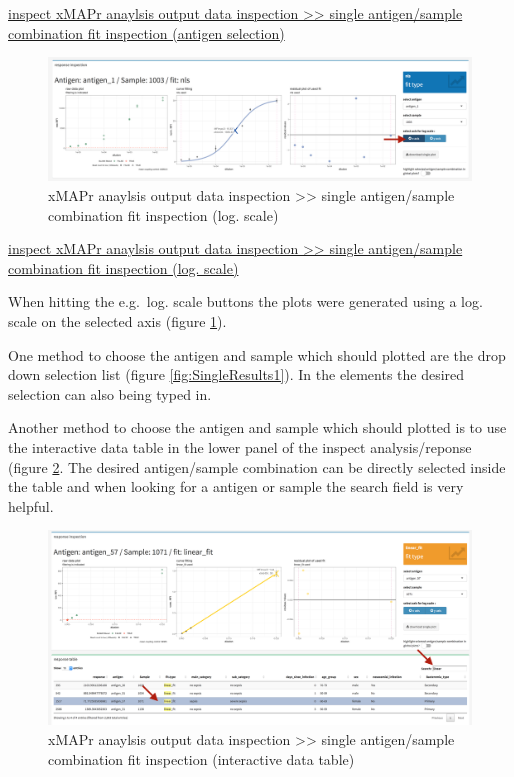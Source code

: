 \documentclass[
]{book}
\begin{document}
\href{figures/inspect_single_results1.png}{inspect xMAPr anaylsis output data inspection \textgreater\textgreater{} single antigen/sample combination fit inspection (antigen selection)}

\begin{figure}
\includegraphics[width=54.97in]{figures/inspect_single_results2} \caption{xMAPr anaylsis output data inspection >> single antigen/sample combination fit inspection (log. scale)}\label{fig:SingleResults2}
\end{figure}

\href{figures/inspect_single_results2.png}{inspect xMAPr anaylsis output data inspection \textgreater\textgreater{} single antigen/sample combination fit inspection (log. scale)}

When hitting the e.g.~log. scale buttons the plots were generated using a log. scale on the selected axis (figure \ref{fig:SingleResults2}).

One method to choose the antigen and sample which should plotted are the drop down selection list (figure \ref{fig:SingleResults1}). In the elements the desired selection can also being typed in.

Another method to choose the antigen and sample which should plotted is to use the interactive data table in the lower panel of the inspect analysis/reponse (figure \ref{fig:SingleResults3}.
The desired antigen/sample combination can be directly selected inside the table and when looking for a antigen or sample the search field is very helpful.

\begin{figure}
\includegraphics[width=54.75in]{figures/inspect_single_results3} \caption{xMAPr anaylsis output data inspection >> single antigen/sample combination fit inspection (interactive data table)}\label{fig:SingleResults3}
\end{figure}
\end{document}
